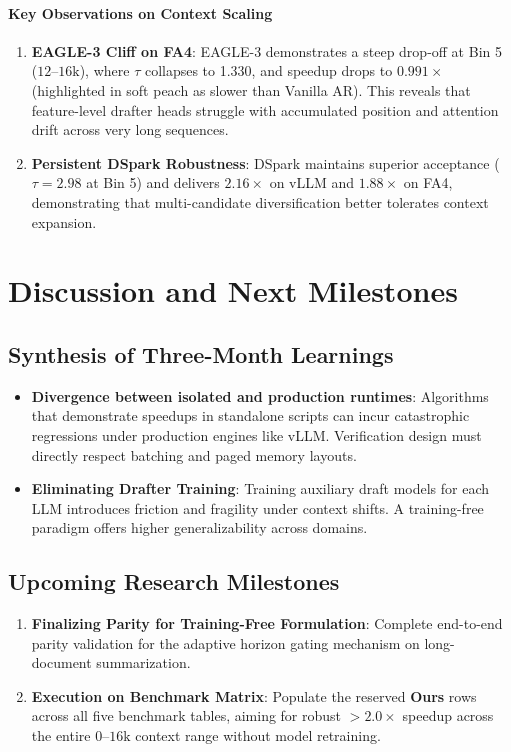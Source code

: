 \documentclass[11pt]{article}
\begin{document}
\paragraph{Key Observations on Context Scaling}
\begin{enumerate}
    \item \textbf{EAGLE-3 Cliff on FA4}: EAGLE-3 demonstrates a steep drop-off at Bin 5 ($12\text{--}16\text{k}$), where $\tau$ collapses to 1.330, and speedup drops to $0.991\times$ (highlighted in soft peach as slower than Vanilla AR). This reveals that feature-level drafter heads struggle with accumulated position and attention drift across very long sequences.
    \item \textbf{Persistent DSpark Robustness}: DSpark maintains superior acceptance ($\tau = 2.98$ at Bin 5) and delivers $2.16\times$ on vLLM and $1.88\times$ on FA4, demonstrating that multi-candidate diversification better tolerates context expansion.
\end{enumerate}

\section{Discussion and Next Milestones}

\subsection{Synthesis of Three-Month Learnings}
\begin{itemize}
    \item \textbf{Divergence between isolated and production runtimes}: Algorithms that demonstrate speedups in standalone scripts can incur catastrophic regressions under production engines like vLLM. Verification design must directly respect batching and paged memory layouts.
    \item \textbf{Eliminating Drafter Training}: Training auxiliary draft models for each LLM introduces friction and fragility under context shifts. A training-free paradigm offers higher generalizability across domains.
\end{itemize}

\subsection{Upcoming Research Milestones}
\begin{enumerate}
    \item \textbf{Finalizing Parity for Training-Free Formulation}: Complete end-to-end parity validation for the adaptive horizon gating mechanism on long-document summarization.
    \item \textbf{Execution on Benchmark Matrix}: Populate the reserved \textbf{Ours} rows across all five benchmark tables, aiming for robust $>2.0\times$ speedup across the entire $0\text{--}16\text{k}$ context range without model retraining.
\end{enumerate}
\end{document}
